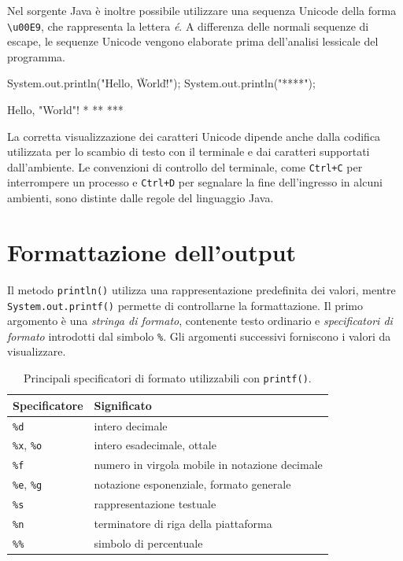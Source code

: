 Nel sorgente Java è inoltre possibile utilizzare
una sequenza Unicode della forma \lstinline|\u00E9|,
che rappresenta la lettera \emph{é}. A differenza
delle normali sequenze di escape, le sequenze
Unicode vengono elaborate prima dell'analisi
lessicale del programma.

\begin{unipdcode}[language=Java]
System.out.println("Hello, \"World\"!");
System.out.println("*\n**\n***");
\end{unipdcode}

\begin{unipdterminal}
Hello, "World"!
*
**
***
\end{unipdterminal}

La corretta visualizzazione dei caratteri Unicode
dipende anche dalla codifica utilizzata per lo scambio
di testo con il terminale e dai caratteri supportati
dall'ambiente. Le convenzioni di controllo del terminale,
come \texttt{Ctrl+C} per interrompere un processo e
\texttt{Ctrl+D} per segnalare la fine dell'ingresso
in alcuni ambienti, sono distinte dalle regole
del linguaggio Java.

\section{Formattazione dell'output}
\label{sec:fi-java-printf}

Il metodo \texttt{println()} utilizza una rappresentazione
predefinita dei valori, mentre \texttt{System.out.printf()}
permette di controllarne la formattazione. Il primo argomento
è una \emph{stringa di formato}, contenente testo ordinario
e \emph{specificatori di formato} introdotti dal simbolo
\texttt{\%}. Gli argomenti successivi forniscono i valori
da visualizzare.

\begin{table}[htbp]
  \centering
  \begin{tabular}{ll}
    \toprule
    Specificatore & Significato \\
    \midrule
    \texttt{\%d} & intero decimale \\
    \texttt{\%x}, \texttt{\%o} & intero esadecimale, ottale \\
    \texttt{\%f} & numero in virgola mobile in notazione decimale \\
    \texttt{\%e}, \texttt{\%g} & notazione esponenziale, formato generale \\
    \texttt{\%s} & rappresentazione testuale \\
    \texttt{\%n} & terminatore di riga della piattaforma \\
    \texttt{\%\%} & simbolo di percentuale \\
    \bottomrule
  \end{tabular}
  \caption{Principali specificatori di formato utilizzabili con
  \texttt{printf()}.}
  \label{tab:fi-java-formati}
\end{table}

